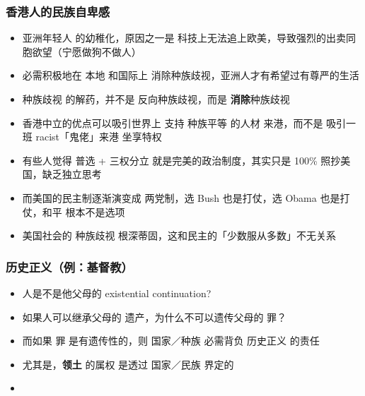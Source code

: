 \documentclass[10pt]{beamer}
\newcommand{\emp}[1]{{\color{blue}\textbf{#1}}}
\begin{document}
\begin{frame}
\frametitle{香港人的民族自卑感}
\begin{itemize}
	\item 亚洲年轻人 的幼稚化，原因之一是 科技上无法追上欧美，导致强烈的出卖同胞欲望（宁愿做狗不做人）
	

	\item 必需积极地在 本地 和国际上 消除种族歧视，亚洲人才有希望过有尊严的生活

	\item 种族歧视 的解药，并不是 反向种族歧视，而是 \emp{消除}种族歧视
	
	\item 香港中立的优点可以吸引世界上 支持 种族平等 的人材 来港，而不是 吸引一班 racist「鬼佬」来港 坐享特权

	\item 有些人觉得 普选 + 三权分立 就是完美的政治制度，其实只是 100\% 照抄美国，缺乏独立思考
	
	\item 而美国的民主制逐渐演变成 两党制，选 Bush 也是打仗，选 Obama 也是打仗，和平 根本不是选项
	
	\item 美国社会的 种族歧视 根深蒂固，这和民主的「少数服从多数」不无关系
\end{itemize}
\end{frame}

\begin{frame}
\frametitle{历史正义（例：基督教）}
\begin{itemize}
	\item 人是不是他父母的 existential continuation?
	
	\item 如果人可以继承父母的 遗产，为什么不可以遗传父母的 罪？
	
	\item 而如果 罪 是有遗传性的，则 国家／种族 必需背负 历史正义 的责任
	
	\item 尤其是，\emp{领土} 的属权 是透过 国家／民族 界定的
	
	\item 
\end{itemize}
\end{frame}
\end{document}

